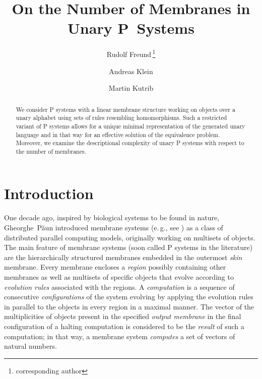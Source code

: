 \documentclass[copyright]{eptcs}
\begin{document}
\title{On the Number of Membranes in Unary P~Systems}
\def\titlerunning{On the Number of Membranes in Unary P~Systems}
\def\authorrunning{R.~Freund, A.~Klein, M.~Kutrib}
 
\author{Rudolf Freund\,\thanks{corresponding author}
\and
Andreas Klein
\and
Martin Kutrib
}

\maketitle

\begin{abstract}
We consider P systems with a linear membrane structure working on objects
over a unary alphabet using sets of rules resembling homomorphisms. Such a
restricted variant of P systems allows for a unique minimal representation
of the generated unary language and in that way for an effective solution 
of the equivalence problem. Moreover, we examine the descriptional 
complexity of unary P systems with respect to the number of membranes.
\end{abstract}

\section{Introduction}

One decade ago, inspired by biological systems to be found in nature,
Gheor\-ghe~P\u{a}un introduced membrane systems (e.\,g., see \cite{Paun1998}) as
a class of distributed parallel computing models, originally working on
multisets of objects. The main feature of membrane systems (soon called P
systems in the literature) are the hierarchically structured membranes
embedded in the outermost \textit{skin} membrane. Every membrane encloses a 
\textit{region} possibly containing other membranes as well as multisets of
specific objects that evolve according to \textit{evolution rules}
associated with the regions. A \textit{computation} is a sequence of
consecutive \textit{configurations} of the system evolving by applying the
evolution rules in parallel to the objects in every region in a maximal
manner. The vector of the multiplicities of objects present in the specified 
\textit{output membrane }in the final configuration of a halting computation
is considered to be the \textit{result} of such a computation; in that way,
a membrane system \textit{computes} a set of vectors of natural numbers.
\end{document}
